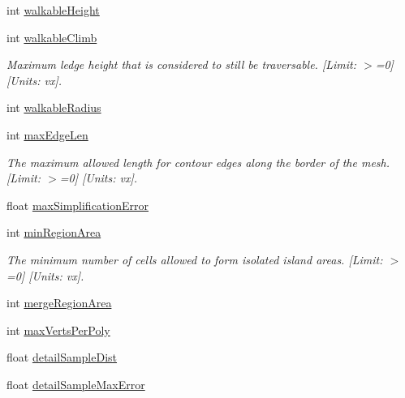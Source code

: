 \begin{DoxyCompactItemize}
int \hyperlink{structrcConfig_ab965b5f2aaa0b1ee7f91b28ead07c8c7}{walkable\+Height}
\item 
\mbox{\label{structrcConfig_accdba9b8409e8c093ee4ac415a989611}} 
int \hyperlink{structrcConfig_accdba9b8409e8c093ee4ac415a989611}{walkable\+Climb}
\begin{DoxyCompactList}\small\item\em Maximum ledge height that is considered to still be traversable. \mbox{[}Limit\+: $>$=0\mbox{]} \mbox{[}Units\+: vx\mbox{]}. \end{DoxyCompactList}\item 
int \hyperlink{structrcConfig_a85f1ff0f181cc33a3cc137cbd025c216}{walkable\+Radius}
\item 
\mbox{\label{structrcConfig_ac3c8ea8caea4497e6307e41cf5d7cc97}} 
int \hyperlink{structrcConfig_ac3c8ea8caea4497e6307e41cf5d7cc97}{max\+Edge\+Len}
\begin{DoxyCompactList}\small\item\em The maximum allowed length for contour edges along the border of the mesh. \mbox{[}Limit\+: $>$=0\mbox{]} \mbox{[}Units\+: vx\mbox{]}. \end{DoxyCompactList}\item 
float \hyperlink{structrcConfig_aaea41eac9de6fed7a068b328ff550601}{max\+Simplification\+Error}
\item 
\mbox{\label{structrcConfig_a0b2bfd311ebc8446751051f048daf377}} 
int \hyperlink{structrcConfig_a0b2bfd311ebc8446751051f048daf377}{min\+Region\+Area}
\begin{DoxyCompactList}\small\item\em The minimum number of cells allowed to form isolated island areas. \mbox{[}Limit\+: $>$=0\mbox{]} \mbox{[}Units\+: vx\mbox{]}. \end{DoxyCompactList}\item 
int \hyperlink{structrcConfig_ab1cb7148f953228fcab32f4cadd69f0a}{merge\+Region\+Area}
\item 
int \hyperlink{structrcConfig_a14739e425b85fde1d8216d32389ff89a}{max\+Verts\+Per\+Poly}
\item 
float \hyperlink{structrcConfig_abdc131d1c8f5e4c1f09a68702efba604}{detail\+Sample\+Dist}
\item 
float \hyperlink{structrcConfig_ae53de5fcf0777c0be9e3cd91c9da3d1f}{detail\+Sample\+Max\+Error}
\end{DoxyCompactItemize}


